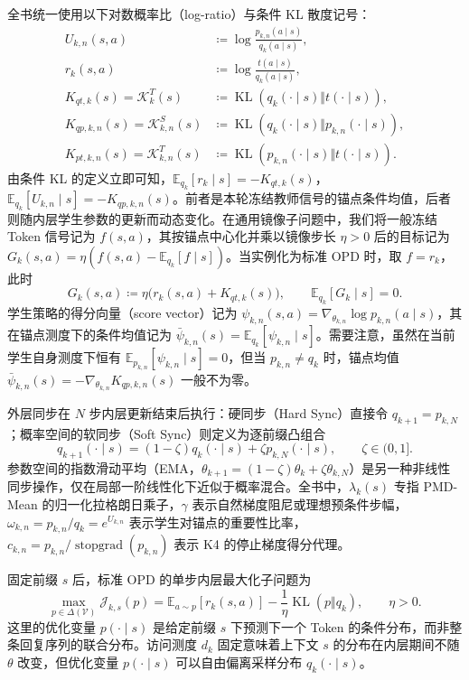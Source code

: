 \documentclass[lang=cn,scheme=chinese,openany]{elegantbook}
\newcommand{\E}{\mathbb E}
\newcommand{\KL}{\operatorname{KL}}
\newcommand{\sg}{\operatorname{stopgrad}}
\begin{document}
全书统一使用以下对数概率比（log-ratio）与条件 KL 散度记号：
\begin{align}
U_{k,n}(s,a)&\coloneqq\log\frac{ p_{k,n}(a\mid s)}{ q_k(a\mid s)},\\
r_k(s,a)&\coloneqq\log\frac{ t(a\mid s)}{ q_k(a\mid s)},\\
K_{qt,k}(s)=\mathcal K_k^T(s)&\coloneqq\KL\!\left( q_k(\cdot\mid s)\Vert t(\cdot\mid s)\right),\\
K_{qp,k,n}(s)=\mathcal K_{k,n}^S(s)&\coloneqq\KL\!\left( q_k(\cdot\mid s)\Vert p_{k,n}(\cdot\mid s)\right),\\
K_{pt,k,n}(s)=\mathcal K_{k,n}^T(s)&\coloneqq\KL\!\left( p_{k,n}(\cdot\mid s)\Vert t(\cdot\mid s)\right).
\end{align}
由条件 KL 的定义立即可知，$\mathbb E_{ q_k}[r_k\mid s]=-K_{qt,k}(s)$，$\mathbb E_{ q_k}[U_{k,n}\mid s]=-K_{qp,k,n}(s)$。前者是本轮冻结教师信号的锚点条件均值，后者则随内层学生参数的更新而动态变化。在通用镜像子问题中，我们将一般冻结 Token 信号记为 $f(s,a)$，其按锚点中心化并乘以镜像步长 $\eta>0$ 后的目标记为 $G_k(s,a)=\eta(f(s,a)-\mathbb E_{ q_k}[f\mid s])$。当实例化为标准 OPD 时，取 $f=r_k$，此时
\begin{equation}
G_k(s,a)\coloneqq\eta\bigl(r_k(s,a)+K_{qt,k}(s)\bigr),
\qquad\mathbb E_{ q_k}[G_k\mid s]=0.
\end{equation}
学生策略的得分向量（score vector）记为 $\psi_{k,n}(s,a)=\nabla_{\theta_{k,n}}\log p_{k,n}(a\mid s)$，其在锚点测度下的条件均值记为 $\bar\psi_{k,n}(s)=\mathbb E_{ q_k}[\psi_{k,n}\mid s]$。需要注意，虽然在当前学生自身测度下恒有 $\mathbb E_{p_{k,n}}[\psi_{k,n}\mid s]=0$，但当 $p_{k,n}\ne q_k$ 时，锚点均值 $\bar\psi_{k,n}(s)=-\nabla_{\theta_{k,n}}K_{qp,k,n}(s)$ 一般不为零。

外层同步在 $N$ 步内层更新结束后执行：硬同步（Hard Sync）直接令 $q_{k+1}=p_{k,N}$；概率空间的软同步（Soft Sync）则定义为逐前缀凸组合
\begin{equation}
q_{k+1}(\cdot\mid s)=(1-\zeta) q_k(\cdot\mid s)+\zeta p_{k,N}(\cdot\mid s),\qquad\zeta\in(0,1].
\end{equation}
参数空间的指数滑动平均（EMA，$\theta_{k+1}=(1-\zeta)\theta_k+\zeta\theta_{k,N}$）是另一种非线性同步操作，仅在局部一阶线性化下近似于概率混合。全书中，$\lambda_k(s)$ 专指 PMD-Mean 的归一化拉格朗日乘子，$\gamma$ 表示自然梯度阻尼或理想预条件步幅，$\omega_{k,n}=p_{k,n}/q_k=e^{U_{k,n}}$ 表示学生对锚点的重要性比率，$c_{k,n}=p_{k,n}/\sg(p_{k,n})$ 表示 K4 的停止梯度得分代理。

固定前缀 $s$ 后，标准 OPD 的单步内层最大化子问题为
\begin{equation}\label{eq:common-objective}
 \max_{p\in\Delta(\mathcal V)}
 \mathcal J_{k,s}(p)
 =\E_{a\sim p}[r_k(s,a)]-
 \frac{1}{\eta}\KL(p\Vert q_k),
 \qquad \eta>0.
\end{equation}
这里的优化变量 $p(\cdot\mid s)$ 是给定前缀 $s$ 下预测下一个 Token 的条件分布，而非整条回复序列的联合分布。访问测度 $d_k$ 固定意味着上下文 $s$ 的分布在内层期间不随 $\theta$ 改变，但优化变量 $p(\cdot\mid s)$ 可以自由偏离采样分布 $q_k(\cdot\mid s)$。
\end{document}

